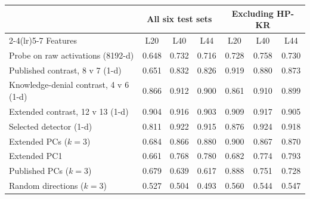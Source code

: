 \begin{tabular}{lcccccc}
\toprule
 & \multicolumn{3}{c}{All six test sets} & \multicolumn{3}{c}{Excluding HP-KR} \\
\cmidrule(lr){2-4}\cmidrule(lr){5-7}
Features & L20 & L40 & L44 & L20 & L40 & L44 \\
\midrule
Probe on raw activations (8192-d) & 0.648 & 0.732 & 0.716 & 0.728 & 0.758 & 0.730 \\
\midrule
Published contrast, 8 v 7 (1-d) & 0.651 & 0.832 & 0.826 & 0.919 & 0.880 & 0.873 \\
Knowledge-denial contrast, 4 v 6 (1-d) & 0.866 & 0.912 & 0.900 & 0.861 & 0.910 & 0.899 \\
Extended contrast, 12 v 13 (1-d) & 0.904 & 0.916 & 0.903 & 0.909 & 0.917 & 0.905 \\
Selected detector (1-d) & 0.811 & 0.922 & 0.915 & 0.876 & 0.924 & 0.918 \\
\midrule
Extended PCs ($k=3$) & 0.684 & 0.866 & 0.880 & 0.900 & 0.867 & 0.870 \\
Extended PC1 & 0.661 & 0.768 & 0.780 & 0.682 & 0.774 & 0.793 \\
Published PCs ($k=3$) & 0.679 & 0.639 & 0.617 & 0.888 & 0.751 & 0.728 \\
Random directions ($k=3$) & 0.527 & 0.504 & 0.493 & 0.560 & 0.544 & 0.547 \\
\bottomrule
\end{tabular}
